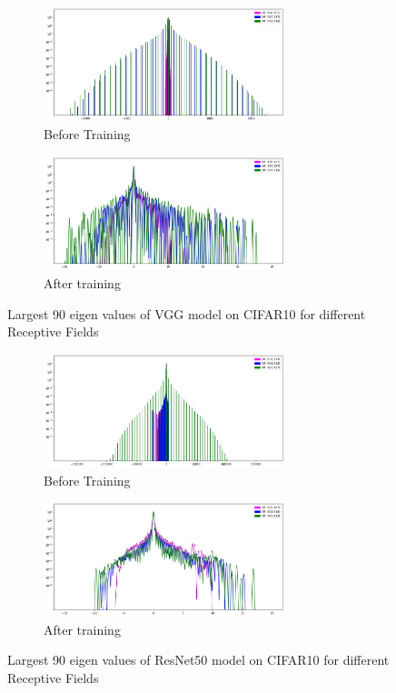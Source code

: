\begin{figure}[!htp]
 \centering
     \begin{subfigure}[b]{0.45\textwidth}
    \includegraphics[width=7cm]{images/Hessian_spectre_vgg19_init_cifar10.png}
    \caption{Before Training}
    \label{subfig:Hessian_VGG_before_training}
     \end{subfigure}
      \hfill
     \begin{subfigure}[b]{0.45\textwidth}
    \includegraphics[width=7cm]{images/Hessian_spectre_vgg19_trained_cifar10.png}
    \caption{After training}
    \label{subfig:Hessian_VGG_after_training}
     \end{subfigure}
     \caption{Largest 90 eigen values of VGG model on CIFAR10 for different Receptive Fields  }
    \label{fig:hessian_vgg_cifar10}
\end{figure}
\begin{figure}[!htp]
 \centering
     \begin{subfigure}[b]{0.45\textwidth}
    \includegraphics[width=7cm]{images/Hessian_spectre_resnet50_init_cifar10.png}
    \caption{Before Training}
    \label{subfig:}
     \end{subfigure}
      \hfill
     \begin{subfigure}[b]{0.45\textwidth}
    \includegraphics[width=7cm]{images/Hessian_spectre_resnet50_trained_cifar10.png}
    \caption{After training}
    \label{subfig:}
     \end{subfigure}
     \caption{Largest 90 eigen values of ResNet50 model on CIFAR10 for different Receptive Fields }
    \label{fig:hessian_resnet50_cifar10}
\end{figure}
